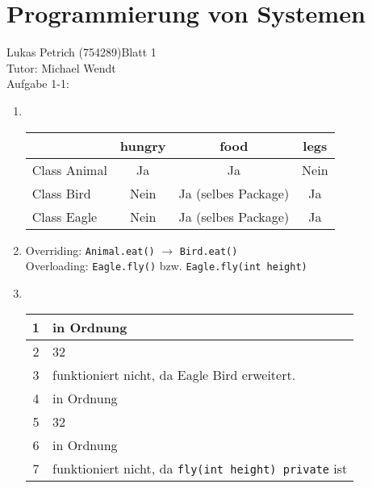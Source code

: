 \documentclass{article}
\begin{document}
\section*{\center Programmierung von Systemen}
Lukas Petrich (754289)\hfill 	Blatt 1\\
Tutor: Michael Wendt \\[5ex]

\large{Aufgabe 1-1:}
\begin{enumerate}
	\item \hfill\\ \begin{tabular}{|l||c|c|c|}
		\hline 
		\rule[-1ex]{0pt}{2.5ex}  & hungry & food & legs \\ 
		\hline \hline
		\rule[-1ex]{0pt}{2.5ex} Class Animal & Ja & Ja & Nein \\ 
		\hline 
		\rule[-1ex]{0pt}{2.5ex} Class Bird & Nein & Ja (selbes Package) & Ja \\ 
		\hline 
		\rule[-1ex]{0pt}{2.5ex} Class Eagle & Nein & Ja (selbes Package) & Ja \\ 
		\hline 
		\end{tabular} 
	
	\item Overriding: \texttt{Animal.eat()} $\rightarrow$ \texttt{Bird.eat()}\\
	 Overloading: \texttt{Eagle.fly()} bzw. \texttt{Eagle.fly(int height)}
	\item \hfill\\ \begin{tabular}{|c|l|}
		\hline 
		1 & in Ordnung \\ 
		\hline 
		2 & 32 \\ 
		\hline 
		3 & funktioniert nicht, da Eagle Bird erweitert. \\ 
		\hline 
		4 & in Ordnung \\ 
		\hline 
		5 & 32 \\ 
		\hline 
		6 & in Ordnung \\ 
		\hline 
		7 & funktioniert nicht, da \texttt{fly(int height) private} ist  \\ 
		\hline 
		\end{tabular} 
\end{enumerate}	
\end{document}

